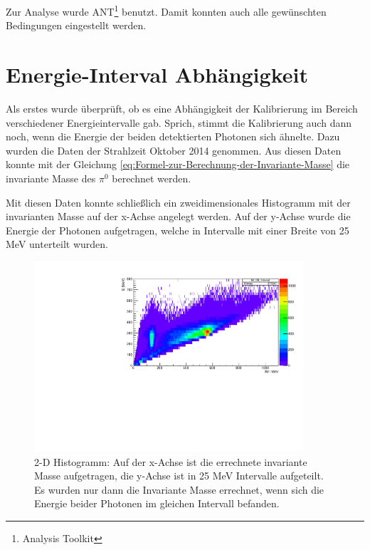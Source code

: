 \documentclass[a4paper,11pt,oneside,final,german,openbib,pdftex]{scrbook}
\begin{document}
{Zur Analyse wurde ANT\footnote{Analysis Toolkit} benutzt. Damit konnten auch alle gew\"unschten Bedingungen eingestellt werden. 



\section{Energie-Interval Abhängigkeit}
\label{sec:Energie-Interval-Abhaengigkeit}

Als erstes wurde überprüft, ob es eine Abhängigkeit der Kalibrierung im Bereich verschiedener Energieintervalle gab. Sprich, stimmt die Kalibrierung auch dann noch, wenn die Energie der beiden detektierten Photonen sich ähnelte. Dazu wurden die Daten der Strahlzeit Oktober 2014 genommen. Aus diesen Daten konnte mit der Gleichung \ref{eq:Formel-zur-Berechnung-der-Invariante-Masse} die invariante Masse des $\pi^0$ berechnet werden. 

Mit diesen Daten konnte schließlich ein zweidimensionales Histogramm mit der invarianten Masse auf der x-Achse angelegt werden. Auf der y-Achse wurde die Energie der Photonen aufgetragen, welche in Intervalle mit einer Breite von 25 MeV unterteilt wurden. 


\begin{figure}[h!]
	\begin{center}
		\includegraphics[width=100mm]{RealDataEnergyIntervalSymmetricPhotonsHist}
	
		\caption{2-D Histogramm: Auf der x-Achse ist die errechnete invariante Masse aufgetragen, die y-Achse ist in 25 MeV Intervalle aufgeteilt. Es wurden nur dann die Invariante Masse errechnet, wenn sich die Energie beider Photonen im gleichen Intervall befanden.}
			\label{fig:Energy-Interval-Hist-All-Bins}
	\end{center}
\end{figure}

}
\end{document}
